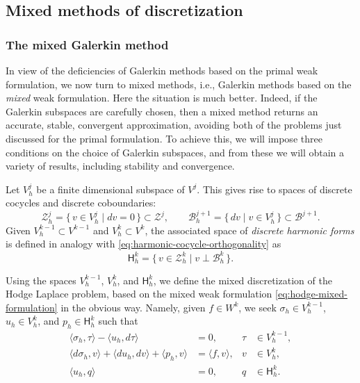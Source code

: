 \subsection{{Mixed methods of discretization}}\label{sec:mixed-methods}

\subsubsection{{The mixed Galerkin method}}\label{subsec:mixed-galerkin}

{In view of the deficiencies of Galerkin methods based on the primal weak formulation, we now turn to mixed methods, i.e., Galerkin methods based on the \emph{mixed} weak formulation. Here the situation is much better. Indeed, if the Galerkin subspaces are carefully chosen, then a mixed method returns an accurate, stable, convergent approximation, avoiding both of the problems just discussed for the primal formulation. To achieve this, we will impose three conditions on the choice of Galerkin subspaces, and from these we will obtain a variety of results, including stability and convergence.}

{Let $V_h^j$ be a finite dimensional subspace of $V^j$. This gives rise to spaces of discrete cocycles and discrete coboundaries:}
\[
\mathcal Z_h^j=\{\,v\in V_h^j\mid dv=0\,\}\subset\mathcal Z^j,\qquad\mathcal B_h^{j+1}=\{\,dv\mid v\in V_h^j\,\}\subset\mathcal B^{j+1}.
\]
{Given $V_h^{k-1}\subset V^{k-1}$ and $V_h^k\subset V^k$, the associated space of \emph{discrete harmonic forms} is defined in analogy with \eqref{eq:harmonic-cocycle-orthogonality} as}
\[
\mathsf H_h^k=\{\,v\in\mathcal Z_h^k\mid v\perp\mathcal B_h^k\,\}.
\]

{Using the spaces $V_h^{k-1}$, $V_h^k$, and $\mathsf H_h^k$, we define the mixed discretization of the Hodge Laplace problem, based on the mixed weak formulation \eqref{eq:hodge-mixed-formulation} in the obvious way. Namely, given $f\in W^k$, we seek $\sigma_h\in V_h^{k-1}$, $u_h\in V_h^k$, and $p_h\in\mathsf H_h^k$ such that}
\begin{equation}\label{eq:mixed-discrete-formulation}
\begin{aligned}
\langle\sigma_h,\tau\rangle-\langle u_h,d\tau\rangle&=0,&\tau&\in V_h^{k-1},\\
\langle d\sigma_h,v\rangle+\langle du_h,dv\rangle+\langle p_h,v\rangle&=\langle f,v\rangle,&v&\in V_h^k,\\
\langle u_h,q\rangle&=0,&q&\in\mathsf H_h^k.
\end{aligned}
\end{equation}

